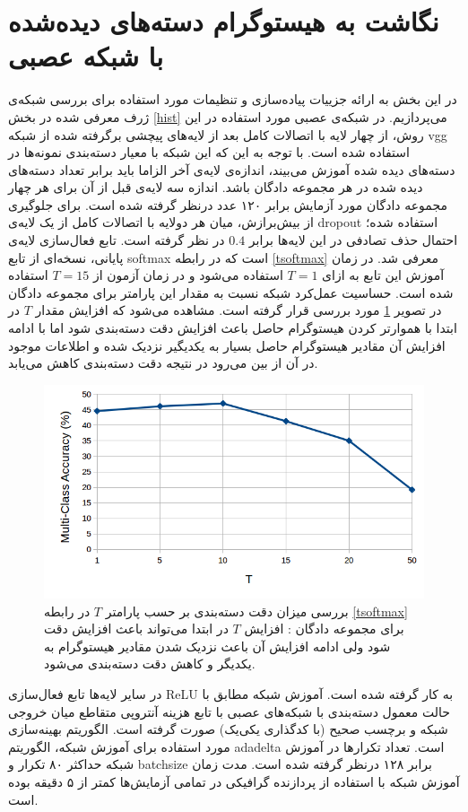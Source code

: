 \section{نگاشت به هیستوگرام دسته‌های دیده‌شده با شبکه عصبی}
در این بخش به ارائه جزییات پیاده‌سازی و تنظیمات مورد استفاده برای بررسی شبکه‌ی ژرف معرفی شده در بخش \ref{hist} می‌پردازیم.
 در شبکه‌ی عصبی مورد استفاده در این روش، از چهار لایه با اتصالات کامل بعد از لایه‌های پیچشی برگرفته شده از شبکه vgg استفاده شده است. با توجه به این که این شبکه با معیار دسته‌بندی نمونه‌ها در دسته‌های دیده شده آموزش می‌بیند،
 اندازه‌ی لایه‌ی آخر الزاما باید برابر تعداد دسته‌های دیده شده در هر مجموعه دادگان باشد. اندازه سه لایه‌ی قبل از آن برای هر چهار مجموعه‌ دادگان مورد آزمایش برابر ۱۲۰ عدد درنظر گرفته شده است. برای جلوگیری از بیش‌برازش، میان هر دولایه با اتصالات کامل از یک لایه‌ی \gls{dropout} \cite{dropout} استفاده شده؛ احتمال حذف تصادفی در این لایه‌ها برابر $0.4$ در نظر گرفته است.
 تابع فعال‌سازی لایه‌ی پایانی، نسخه‌ای از تابع softmax است که در رابطه \eqref{tsoftmax} معرفی شد. در زمان آموزش این تابع به ازای $T=1$ استفاده می‌شود و در زمان آزمون از $T=15$ استفاده شده است. حساسیت عمل‌کرد شبکه نسبت به مقدار این پارامتر برای مجموعه دادگان  در تصویر \ref{hist_param} مورد بررسی قرار گرفته است. مشاهده می‌شود که افزایش مقدار $T$ در ابتدا با هموارتر کردن هیستوگرام حاصل باعث افزایش دقت دسته‌بندی شود اما با ادامه افزایش آن مقادیر هیستوگرام حاصل بسیار به یکدیگیر نزدیک شده و اطلاعات موجود در آن از بین می‌رود در نتیجه دقت دسته‌بندی کاهش می‌یابد.
 \begin{figure}[!t]
\centering
\includegraphics[width=0.75\linewidth]{images/hist_param}
\caption[بررسی تاثیر پارامترهای روش نگاشت به هیستوگرام با شبکه عصبی]{
بررسی میزان دقت دسته‌بندی بر حسب پارامتر $T$ در رابطه \eqref{tsoftmax} برای مجموعه دادگان : افزایش $T$ در ابتدا می‌تواند باعث افزایش دقت شود ولی ادامه افزایش آن باعث نزدیک شدن مقادیر هیستوگرام به یکدیگر و کاهش دقت دسته‌بندی می‌شود.
}
\label{hist_param}
\end{figure}
در سایر لایه‌ها تابع فعال‌سازی ReLU به کار گرفته شده است. آموزش شبکه مطابق با حالت معمول دسته‌بندی با شبکه‌های عصبی  با تابع هزینه آنتروپی متقاطع میان خروجی شبکه و  برچسب صحیح (با کدگذاری یکی‌یک) صورت گرفته است. الگوریتم بهینه‌سازی مورد استفاده برای آموزش شبکه، الگوریتم adadelta \cite{adadelta} است. تعداد تکرارها در آموزش شبکه حداکثر ۸۰ تکرار و \gls{batchsize} برابر ۱۲۸ درنظر گرفته شده است. مدت زمان آموزش شبکه با استفاده از پردازنده گرافیکی
در تمامی آزمایش‌ها کمتر از ۵ دقیقه بوده است.


